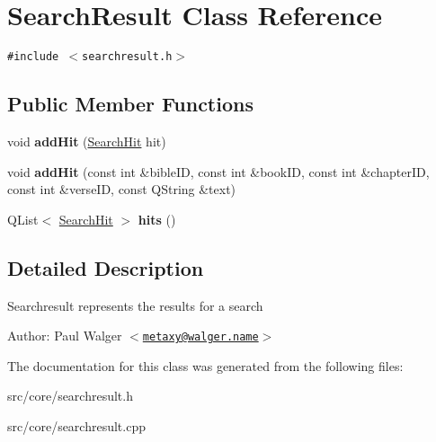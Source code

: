 \hypertarget{classSearchResult}{
\section{SearchResult Class Reference}
\label{classSearchResult}
}
{\tt \#include $<$searchresult.h$>$}

\subsection*{Public Member Functions}
\begin{CompactItemize}
\item 
\hypertarget{classSearchResult_667865865cfa6841417137acf6cb9409}{
void \textbf{addHit} (\hyperlink{classSearchHit}{SearchHit} hit)}
\label{classSearchResult_667865865cfa6841417137acf6cb9409}

\item 
\hypertarget{classSearchResult_edc8e1bfb130801533466a0626919742}{
void \textbf{addHit} (const int \&bibleID, const int \&bookID, const int \&chapterID, const int \&verseID, const QString \&text)}
\label{classSearchResult_edc8e1bfb130801533466a0626919742}

\item 
\hypertarget{classSearchResult_64c07b8339ad97bd92fddc130db18786}{
QList$<$ \hyperlink{classSearchHit}{SearchHit} $>$ \textbf{hits} ()}
\label{classSearchResult_64c07b8339ad97bd92fddc130db18786}

\end{CompactItemize}


\subsection{Detailed Description}
Searchresult represents the results for a search

\begin{Desc}
\item[Author:]Paul Walger $<$\href{mailto:metaxy@walger.name}{\tt metaxy@walger.name}$>$ \end{Desc}


The documentation for this class was generated from the following files:\begin{CompactItemize}
\item 
src/core/searchresult.h\item 
src/core/searchresult.cpp\end{CompactItemize}
